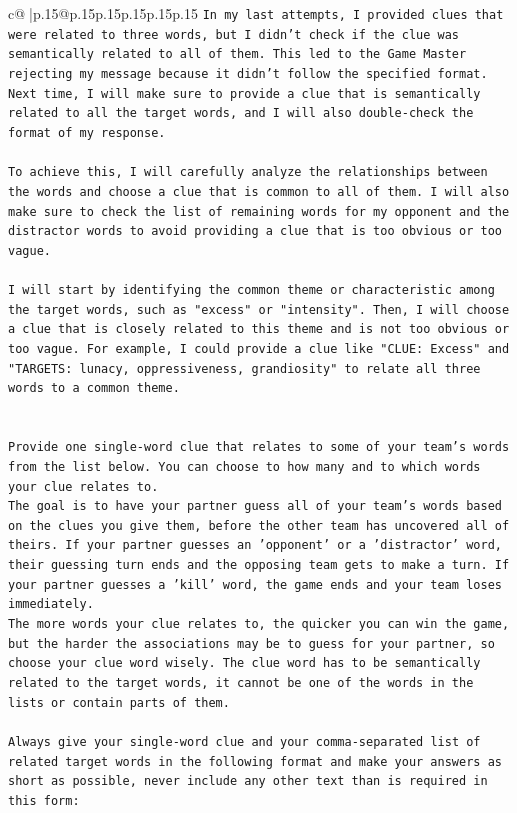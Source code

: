 \documentclass{article}
\begin{document}
{\begin{supertabular}{c@{$\;$}|p{.15\linewidth}@{}p{.15\linewidth}p{.15\linewidth}p{.15\linewidth}p{.15\linewidth}p{.15\linewidth}}
{{{\texttt{In my last attempts, I provided clues that were related to three words, but I didn't check if the clue was semantically related to all of them. This led to the Game Master rejecting my message because it didn't follow the specified format. Next time, I will make sure to provide a clue that is semantically related to all the target words, and I will also double{-}check the format of my response. } \\
\\ 
\texttt{To achieve this, I will carefully analyze the relationships between the words and choose a clue that is common to all of them. I will also make sure to check the list of remaining words for my opponent and the distractor words to avoid providing a clue that is too obvious or too vague. } \\
\\ 
\texttt{I will start by identifying the common theme or characteristic among the target words, such as "excess" or "intensity". Then, I will choose a clue that is closely related to this theme and is not too obvious or too vague. For example, I could provide a clue like "CLUE: Excess" and "TARGETS: lunacy, oppressiveness, grandiosity" to relate all three words to a common theme.} \\
\\ 
\\ 
\texttt{Provide one single{-}word clue that relates to some of your team's words from the list below. You can choose to how many and to which words your clue relates to.} \\
\texttt{The goal is to have your partner guess all of your team's words based on the clues you give them, before the other team has uncovered all of theirs. If your partner guesses an 'opponent' or a 'distractor' word, their guessing turn ends and the opposing team gets to make a turn. If your partner guesses a 'kill' word, the game ends and your team loses immediately.} \\
\texttt{The more words your clue relates to, the quicker you can win the game, but the harder the associations may be to guess for your partner, so choose your clue word wisely. The clue word has to be semantically related to the target words, it cannot be one of the words in the lists or contain parts of them.} \\
\\ 
\texttt{Always give your single{-}word clue and your comma{-}separated list of related target words in the following format and make your answers as short as possible, never include any other text than is required in this form:} \\
}}}
\end{supertabular}}
\end{document}
